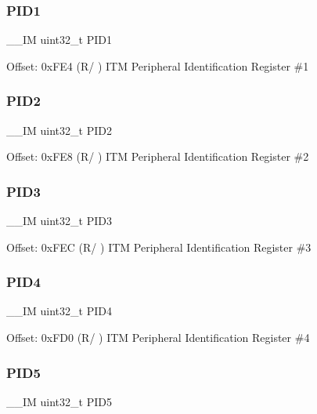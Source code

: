 \subsubsection{\texorpdfstring{PID1}{PID1}}
{\footnotesize\ttfamily \+\_\+\+\_\+\+IM uint32\+\_\+t P\+I\+D1}

Offset\+: 0x\+F\+E4 (R/ ) I\+TM Peripheral Identification Register \#1 \mbox{\label{struct_i_t_m___type_a63db39f871596d28e69c283288ea2eba}} 
\subsubsection{\texorpdfstring{PID2}{PID2}}
{\footnotesize\ttfamily \+\_\+\+\_\+\+IM uint32\+\_\+t P\+I\+D2}

Offset\+: 0x\+F\+E8 (R/ ) I\+TM Peripheral Identification Register \#2 \mbox{\label{struct_i_t_m___type_ac2d006eed52ba550a309e5f61ed9c401}} 
\subsubsection{\texorpdfstring{PID3}{PID3}}
{\footnotesize\ttfamily \+\_\+\+\_\+\+IM uint32\+\_\+t P\+I\+D3}

Offset\+: 0x\+F\+EC (R/ ) I\+TM Peripheral Identification Register \#3 \mbox{\label{struct_i_t_m___type_a4c002e97cda2375d7421ad6415b6a02f}} 
\subsubsection{\texorpdfstring{PID4}{PID4}}
{\footnotesize\ttfamily \+\_\+\+\_\+\+IM uint32\+\_\+t P\+I\+D4}

Offset\+: 0x\+F\+D0 (R/ ) I\+TM Peripheral Identification Register \#4 \mbox{\label{struct_i_t_m___type_ac085b26f43fefeef9a4cf5c2af5e4a38}} 
\subsubsection{\texorpdfstring{PID5}{PID5}}
{\footnotesize\ttfamily \+\_\+\+\_\+\+IM uint32\+\_\+t P\+I\+D5}

